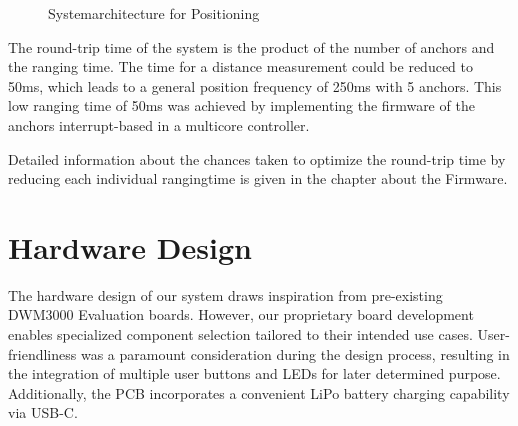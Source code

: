 \documentclass[conference, a4paper]{IEEEtran}
\begin{document}
\begin{figure}[hbt!]
	\centering
	\caption{Systemarchitecture for Positioning}
	\label{fig:systemarch}
\end{figure}

The round-trip time of the system is the product of the number of anchors and the ranging time.
The time for a distance measurement could be reduced to 50ms, which leads to a general position frequency of 250ms with 5 anchors.
This low ranging time of 50ms was achieved by implementing the firmware of the anchors interrupt-based in a multicore controller.

Detailed information about the chances taken to optimize the round-trip time by reducing each individual rangingtime
is given in the chapter about the Firmware.


\section{Hardware Design}\label{section:hardware}
The hardware design of our system draws inspiration from pre-existing DWM3000 Evaluation
boards.
However, our proprietary board development enables specialized component selection
tailored to their intended use cases.
User-friendliness was a paramount consideration during the design process,
resulting in the integration of multiple user buttons and LEDs for later determined purpose.
Additionally, the PCB incorporates a convenient LiPo battery charging capability
via USB-C.
\end{document}
